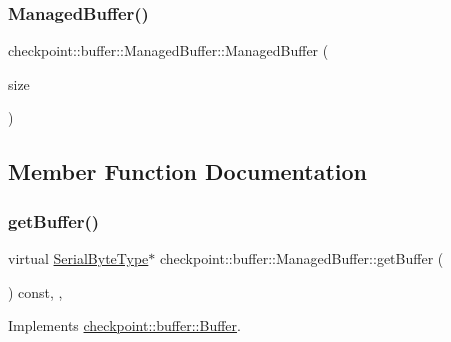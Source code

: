 \subsubsection{\texorpdfstring{Managed\+Buffer()}{ManagedBuffer()}}
{\footnotesize\ttfamily checkpoint\+::buffer\+::\+Managed\+Buffer\+::\+Managed\+Buffer (\begin{DoxyParamCaption}\item[{\hyperlink{namespacecheckpoint_a083f6674da3f94c2901b18c6d238217c}{Serial\+Size\+Type} const \&}]{size }\end{DoxyParamCaption})\hspace{0.3cm}{\ttfamily [inline]}}



\subsection{Member Function Documentation}
\mbox{\label{structcheckpoint_1_1buffer_1_1_managed_buffer_a9a44d0c4e088ac080f13c84072a86e91}} 
\subsubsection{\texorpdfstring{get\+Buffer()}{getBuffer()}}
{\footnotesize\ttfamily virtual \hyperlink{namespacecheckpoint_ae57f01cdc0b81776c23b6c7c934c58f5}{Serial\+Byte\+Type}$\ast$ checkpoint\+::buffer\+::\+Managed\+Buffer\+::get\+Buffer (\begin{DoxyParamCaption}{ }\end{DoxyParamCaption}) const\hspace{0.3cm}{\ttfamily [inline]}, {\ttfamily [override]}, {\ttfamily [virtual]}}



Implements \hyperlink{structcheckpoint_1_1buffer_1_1_buffer_a11fcf5b280408aef29cd21dd722006c3}{checkpoint\+::buffer\+::\+Buffer}.

\mbox{\label{structcheckpoint_1_1buffer_1_1_managed_buffer_a26f85bcd885624b7c0ad6fd8572ad466}} 
